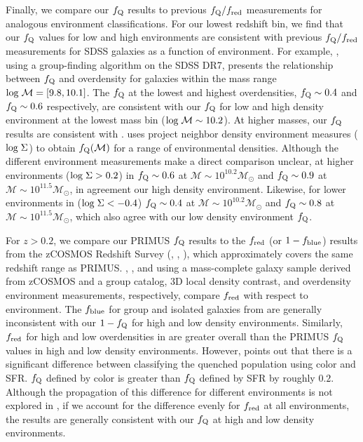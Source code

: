 \documentclass{emulateapj}
\begin{document}
Finally, we compare our $f_{\rm{Q}}$ results to previous $f_{\rm{Q}}/f_{\rm{red}}$ measurements for analogous environment classifications. For our lowest redshift bin, we find that our $f_{\rm{Q}}$ values for low and high environments are consistent with previous $f_{\rm{Q}}/f_{\rm{red}}$ measurements for SDSS galaxies as a function of environment. For example, \cite{Tinker:2011aa}, using a group-finding algorithm on the SDSS DR7, presents the relationship between $f_{\rm{Q}}$ and overdensity for galaxies within the mass range $\rm{log} \; \mathcal{M} = [9.8, 10.1]$. The \cite{Tinker:2011aa} $f_{\rm{Q}}$ at the lowest and highest overdensities, $f_{\rm{Q}} \sim 0.4$ and $f_{\rm{Q}} \sim 0.6$ respectively, are consistent with our $f_{\rm{Q}}$ for low and high density environment at the lowest mass bin ($\rm{log} \; \mathcal{M} \sim 10.2$). At higher masses, our $f_{\rm{Q}}$ results are consistent with \cite{Baldry:2006aa}. \cite{Baldry:2006aa} uses project neighbor density environment measures ($\rm{log} \;  \Sigma$) to obtain $f_{\rm{Q}}(\mathcal{M})$ for a range of environmental densities. Although the different environment measurements make a direct comparison unclear, at higher environments ($\rm{log} \; \Sigma > 0.2$) in \cite{Baldry:2006aa} $f_{\rm{Q}} \sim 0.6$ at $\mathcal{M} \sim 10^{10.2} \mathcal{M}_{\odot}$ and $f_{\rm{Q}} \sim 0.9$ at $\mathcal{M} \sim 10^{11.5} \mathcal{M}_{\odot}$, in agreement our high density environment. Likewise, for lower environments in \cite{Baldry:2006aa} ($\rm{log} \; \Sigma < -0.4$) $f_{\rm{Q}} \sim 0.4$ at $\mathcal{M} \sim 10^{10.2} \mathcal{M}_{\odot}$ and $f_{\rm{Q}} \sim 0.8$ at $\mathcal{M} \sim 10^{11.5} \mathcal{M}_{\odot}$, which also agree with our low density environment $f_{\rm{Q}}$. 

For $z > 0.2$, we compare our PRIMUS $f_{\rm{Q}}$ results to the $f_{\rm{red}}$ (or $1-f_{\rm{blue}}$) results from the zCOSMOS Redshift Survey (\cite{Iovino:2010aa}, \cite{Cucciati:2010aa}, \cite{Kovac:2014aa}), which approximately covers the same redshift range as PRIMUS. \cite{Iovino:2010aa}, \cite{Cucciati:2010aa}, and \cite{Kovac:2014aa} using a mass-complete galaxy sample derived from zCOSMOS and a group catalog, 3D local density contrast, and overdensity environment measurements, respectively, compare $f_{\rm{red}}$ with respect to environment. The $f_{\rm{blue}}$ for group and isolated galaxies from \cite{Iovino:2010aa} are generally inconsistent with our $1-f_{\rm{Q}}$ for high and low density environments. Similarly, $f_{\rm{red}}$ for high and low overdensities in \cite{Kovac:2014aa} are  greater overall than the PRIMUS $f_{\rm{Q}}$ values in high and low density environments. However, \cite{Kovac:2014aa} points out that there is a significant difference between classifying the quenched population using color and SFR. $f_{\rm{Q}}$ defined by color is greater than $f_{\rm{Q}}$ defined by SFR by roughly $0.2$. Although the propagation of this difference for different environments is not explored in \cite{Kovac:2014aa}, if we account for the difference evenly for $f_{\rm{red}}$ at all environments, the \cite{Kovac:2014aa} results are generally consistent with our $f_{\rm{Q}}$ at high and low density environments. 
\end{document}
